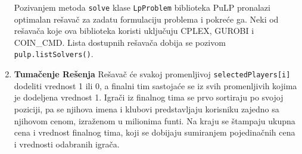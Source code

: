 \documentclass[a4paper]{article}
\begin{document}
\begin{enumerate}
  Pozivanjem metoda \texttt{solve} klase \texttt{LpProblem} biblioteka PuLP pronalazi optimalan rešavač za zadatu formulaciju problema i pokreće ga. Neki od rešavača koje ova biblioteka koristi uključuju CPLEX, GUROBI i COIN\_CMD. Lista dostupnih rešavača dobija se pozivom \texttt{pulp.listSolvers()}.
  \item  \textbf{Tumačenje Rešenja} \newline \newline
  Rešavač će svakoj promenljivoj \texttt{selectedPlayers[i]} dodeliti vrednost 1 ili 0, a finalni tim sastojaće se iz svih promenljivih kojima je dodeljena vrednost 1. Igrači iz finalnog tima se prvo sortiraju po svojoj poziciji, pa se njihova imena i klubovi predstavljaju korisniku zajedno sa njihovom cenom, izraženom u milionima funti. Na kraju se štampaju ukupna cena i vrednost finalnog tima, koji se dobijaju sumiranjem pojedinačnih cena i vrednosti odabranih igrača.
\end{enumerate} 




\end{document}

